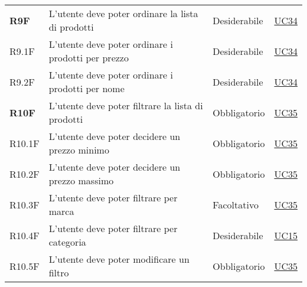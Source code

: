 \begin{center}
\begin{longtable}[!h]{p{50px} p{245px} p{75px} p{50px}}
        \textbf{R9F}                          & L'utente deve poter ordinare la lista di prodotti                                                                                                      & Desiderabile             & \hyperref[sec:UC34]{UC34}                      \\
        R9.1F                                 & L'utente deve poter ordinare i prodotti per prezzo                                                                                                     & Desiderabile             & \hyperref[sec:UC34]{UC34}                      \\
        R9.2F                                 & L'utente deve poter ordinare i prodotti per nome                                                                                                       & Desiderabile             & \hyperref[sec:UC34]{UC34}                      \\
        \textbf{R10F}                         & L'utente deve poter filtrare la lista di prodotti                                                                                                      & Obbligatorio             & \hyperref[sec:UC35]{UC35}                      \\
        R10.1F                                & L'utente deve poter decidere un prezzo minimo                                                                                                          & Obbligatorio             & \hyperref[sec:UC35]{UC35}                      \\
        R10.2F                                & L'utente deve poter decidere un prezzo massimo                                                                                                         & Obbligatorio             & \hyperref[sec:UC35]{UC35}                      \\
        R10.3F                                & L'utente deve poter filtrare per marca                                                                                                                 & Facoltativo              & \hyperref[sec:UC35]{UC35}                      \\
        R10.4F                                & L'utente deve poter filtrare per categoria                                                                                                             & Desiderabile             & \hyperref[sec:UC15]{UC15}                      \\
        R10.5F                                & L'utente deve poter modificare un filtro                                                                                                               & Obbligatorio             & \hyperref[sec:UC35]{UC35}                      \\

\end{longtable}
\end{center}
